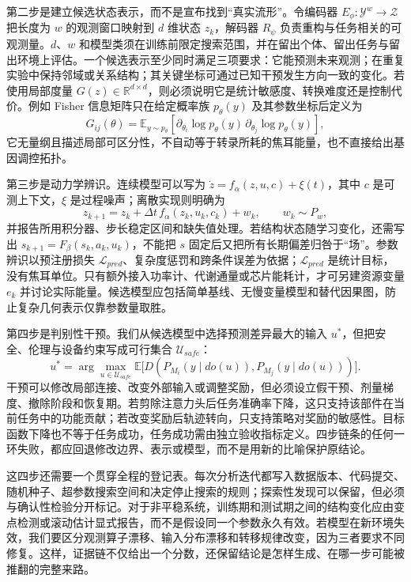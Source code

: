 第二步是建立候选状态表示，而不是宣布找到“真实流形”。令编码器 $E_\phi:\mathcal Y^{w}\rightarrow\mathcal Z$ 把长度为 $w$ 的观测窗口映射到 $d$ 维状态 $z_k$，解码器 $R_\psi$ 负责重构与任务相关的可观测量。$d$、$w$ 和模型类须在训练前限定搜索范围，并在留出个体、留出任务与留出环境上评估。一个候选表示至少同时满足三项要求：它能预测未来观测；在重复实验中保持邻域或关系结构；其关键坐标可通过已知干预发生方向一致的变化。若使用局部度量 $G(z)\in\mathbb R^{d\times d}$，则必须说明它是统计敏感度、转换难度还是控制代价。例如 Fisher 信息矩阵只在给定概率族 $p_\theta(y)$ 及其参数坐标后定义为
\begin{equation}
 G_{ij}(\theta)=\mathbb E_{y\sim p_\theta}
 \left[\partial_{\theta_i}\log p_\theta(y)\,
 \partial_{\theta_j}\log p_\theta(y)\right],
\end{equation}
它无量纲且描述局部可区分性，不自动等于转录所耗的焦耳能量，也不直接给出基因调控拓扑。

第三步是动力学辨识。连续模型可以写为 $\dot z=f_\alpha(z,u,c)+\xi(t)$，其中 $c$ 是可测上下文，$\xi$ 是过程噪声；离散实现则明确为
\begin{equation}
 z_{k+1}=z_k+\Delta t\,f_\alpha(z_k,u_k,c_k)+w_k,
 \qquad w_k\sim P_w,
\end{equation}
并报告所用积分器、步长稳定区间和缺失值处理。若结构状态随学习变化，还需写出 $s_{k+1}=F_\beta(s_k,a_k,u_k)$，不能把 $s$ 固定后又把所有长期偏差归咎于“场”。参数辨识以预注册损失 $\mathcal L_{pred}$、复杂度惩罚和跨条件误差为依据；$\mathcal L_{pred}$ 是统计目标，没有焦耳单位。只有额外接入功率计、代谢通量或芯片能耗计，才可另建资源变量 $e_k$ 并讨论实际能量。候选模型应包括简单基线、无慢变量模型和替代因果图，防止复杂几何表示仅靠参数量取胜。

第四步是判别性干预。我们从候选模型中选择预测差异最大的输入 $u^*$，但把安全、伦理与设备约束写成可行集合 $\mathcal U_{safe}$：
\begin{equation}
 u^*=\arg\max_{u\in\mathcal U_{safe}}
 \mathbb E\bigl[D(P_{M_i}(y\mid do(u)),P_{M_j}(y\mid do(u)))\bigr].
\end{equation}
干预可以修改局部连接、改变外部输入或调整奖励，但必须设立假干预、剂量梯度、撤除阶段和恢复期。若剪除注意力头后任务准确率下降，这只支持该部件在当前任务中的功能贡献；若改变奖励后轨迹转向，只支持策略对奖励的敏感性。目标函数下降也不等于任务成功，任务成功需由独立验收指标定义。四步链条的任何一环失败，都应回退修改边界、表示或模型，而不是用新的比喻保护原结论。

这四步还需要一个贯穿全程的登记表。每次分析迭代都写入数据版本、代码提交、随机种子、超参数搜索空间和决定停止搜索的规则；探索性发现可以保留，但必须与确认性检验分开标记。对于非平稳系统，训练期和测试期之间的结构变化应由变点检测或滚动估计显式报告，而不是假设同一个参数永久有效。若模型在新环境失效，我们要区分观测算子漂移、输入分布漂移和转移规律改变，因为三者要求不同修复。这样，证据链不仅给出一个分数，还保留结论是怎样生成、在哪一步可能被推翻的完整来路。

